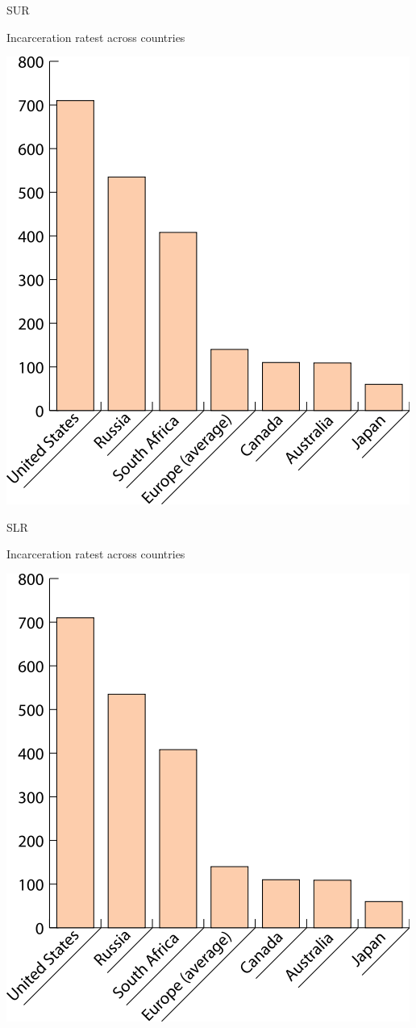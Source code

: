 \begin{chart}{S}{UR}
\caption{Incarceration ratest across countries}
\label{chart:incarceration}
\includegraphics[width=\chartwidth,height=\chartheight]{incarceration}  
\end{chart}

\begin{chart}{S}{LR}
\caption{Incarceration ratest across countries}
\label{chart:incarceration}
\includegraphics[width=\chartwidth,height=\chartheight]{incarceration}  
\end{chart}

